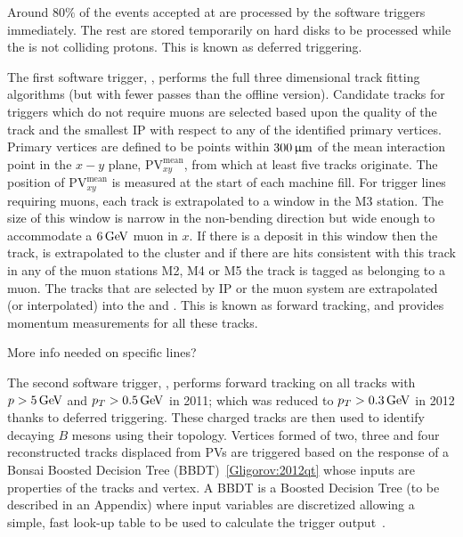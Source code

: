 Around $80\%$ of the events accepted at \lone are processed by the software triggers immediately.
The rest are stored temporarily on hard disks to be processed while the \lhc is not colliding protons.
This is known as deferred triggering.

The first software trigger, \hltone, performs the full three dimensional \velo track fitting
algorithms (but with fewer passes than the offline version).
Candidate \velo tracks for triggers which do not require muons are selected based upon the quality of the
\velo track and the smallest IP with respect to any of the identified primary vertices.
Primary vertices are defined to be points within $300\,\upmu\rm m$ of the mean
interaction point in the $x-y$ plane, $\mathrm{PV}^\mathrm{mean}_{xy}$, from which at least five
tracks originate.
The position of $\mathrm{PV}^\mathrm{mean}_{xy}$ is measured at the start of each \lhc machine
fill.
For trigger lines requiring muons, each \velo track is extrapolated to a window in the M3
station.
The size of this window is narrow in the non-bending direction but wide enough to accommodate a $6\mathrm{\,Ge\kern -0.1em V}$
muon in $x$.
If there is a deposit in this window then the \velo track, is extrapolated to the cluster and if
there are hits consistent with this track in any of the muon stations M2, M4 or M5 the track is
tagged as belonging to a muon.
The \velo tracks that are selected by IP or the muon system are extrapolated (or interpolated) into
the \intr and \ot.
This is known as forward tracking, and provides momentum measurements for all these tracks.

More info needed on specific lines?

The second software trigger, \hlttwo, performs forward tracking on all \velo tracks with
$p>5\mathrm{\,Ge\kern -0.1em V}$ and $p_T>0.5\mathrm{\,Ge\kern -0.1em V}$ in 2011; which was reduced to $p_T>0.3\mathrm{\,Ge\kern -0.1em V}$ in 2012 thanks to deferred
triggering.
These charged tracks are then used to identify decaying $B$ mesons using their topology.
Vertices formed of two, three and four reconstructed tracks displaced from PVs are triggered based
on the response of a Bonsai Boosted Decision Tree (BBDT)~\ref{Gligorov:2012qt} whose inputs are
properties of the tracks and vertex.
A BBDT is a Boosted Decision Tree (to be described in an Appendix) where input variables are
discretized allowing a simple, fast look-up table to be used to calculate the trigger
output~\cite{Gligorov:2012qt}.


